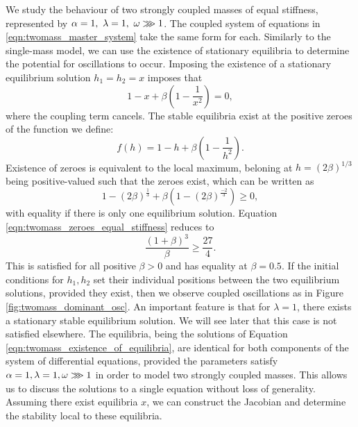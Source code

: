 \documentclass{article}
\begin{document}
We study the behaviour of two strongly coupled masses of equal stiffness, represented by \( \alpha = 1,~\lambda = 1,~\omega \gggtr 1\).
The coupled system of equations in \ref{eqn:twomass_master_system} take the same form for each.
Similarly to the single-mass model, we can use the existence of stationary equilibria to determine the potential for oscillations to occur.
Imposing the existence of a stationary equilibrium solution \(h_1 = h_2 = x\) imposes that
\begin{equation}
    1 - x + \beta\left(
        1 - \frac{1}{x^2}
    \right) = 0,
\end{equation}
where the coupling term cancels.
The stable equilibria exist at the positive zeroes of the function we define:
\begin{equation}
    f(h) = 1 - h + \beta \left( 1 - \frac{1}{h^2} \right).
    \label{eqn:twomass_existence_of_equilibria}
\end{equation}
Existence of zeroes is equivalent to the local maximum, beloning at \(h = \left( 2\beta \right)^{1/3}\) being positive-valued such that the zeroes exist,
which can be written as
\begin{equation}
    1 - \left(2\beta\right)^\frac{1}{3} + \beta\left( 1 - (2\beta)^\frac{-2}{3} \right) \ge 0,
    \label{eqn:twomass_zeroes_equal_stiffness}
\end{equation}
with equality if there is only one equilibrium solution.
Equation \ref{eqn:twomass_zeroes_equal_stiffness} reduces to
\begin{equation}
    \frac{(1+\beta)^3}{\beta} \ge \frac{27}{4}.
\end{equation}
This is satisfied for all positive $\beta>0$ and has equality at $\beta = 0.5$.
If the initial conditions for \(h_1, h_2\) set their individual positions between the two equilibrium solutions,
provided they exist,
then we observe coupled oscillations as in Figure \ref{fig:twomass_dominant_osc}.
An important feature is that for \(\lambda = 1\), there exists a stationary stable equilibrium solution.
We will see later that this case is not satisfied elsewhere. %
The equilibria, being the solutions of Equation \ref{eqn:twomass_existence_of_equilibria}, are identical for both components of the system of differential equations,
provided the parameters satisfy \(\alpha = 1, \lambda = 1, \omega \gggtr 1\) in order to model two strongly coupled masses.
This allows us to discuss the solutions to a single equation without loss of generality.
Assuming there exist equilibria \(x\), 
we can construct the Jacobian and determine the stability local to these equilibria.
\end{document}
